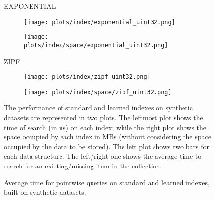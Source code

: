 \documentclass{article}
\begin{document}
\begin{figure}[!htbp]
{\begin{minipage}[t][0.98\textheight][t]{\textwidth}
    \begin{minipage}{0.05\linewidth}
    \begin{sideways}\small EXPONENTIAL\end{sideways}
    \end{minipage}
    \begin{minipage}{0.3\linewidth}
        \begin{figure}[H]
        \texttt{[image: plots/index/exponential\_uint32.png]}
        \end{figure}
    \end{minipage}
    \begin{minipage}{0.3\linewidth}
        \begin{figure}[H]
            \texttt{[image: plots/index/space/exponential\_uint32.png]}
        \end{figure}
    \end{minipage}
    \vspace*{-20px}

    \begin{minipage}{0.05\linewidth}
    \begin{sideways}\small ZIPF\end{sideways}
    \end{minipage}
    \begin{minipage}{0.3\linewidth}
        \begin{figure}[H]
        \texttt{[image: plots/index/zipf\_uint32.png]}
        \end{figure}
    \end{minipage}
    \begin{minipage}{0.3\linewidth}
        \begin{figure}[H]
            \texttt{[image: plots/index/space/zipf\_uint32.png]}
        \end{figure}
    \end{minipage}
    \vfill
    
    \centering
    \begin{minipage}{\linewidth}
        The performance of standard and learned indexes on synthetic datasets are represented in two plots. The leftmost plot shows the time of search (in ns) on each index; while the right plot shows the space occupied by each index in MBs (without considering the space occupied by the data to be stored). The left plot shows two bars for each data structure. The left/right one shows the average time to search for an existing/missing item in the collection.
    \end{minipage}
    \vspace{10px}
\end{minipage}
}
\caption{Average time for pointwise queries on standard and learned indexes, built on synthetic datasets.}
\end{figure}
\end{document}
